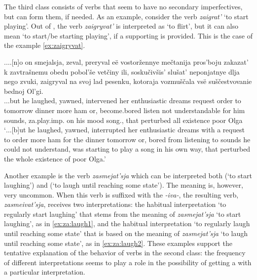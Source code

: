 The third class consists of verbs that seem to have no secondary imperfectives, but can form them, if needed. As an example, consider the verb \textit{zaigrat'} `to start playing'. Out of , the verb \textit{zaigryvat'} is interpreted as `to flirt', but it can also mean `to start/be starting playing', if a supporting  is provided. This is the case of the example \ref{ex:zaigryvat}. 

\exg.\label{ex:zaigryvat}$\ldots$[n]o on smejalsja, zeval, preryval e\"{e} vostor\v{z}ennye me\v{c}tanija pros'boju zakazat' k zavtra\v{s}nemu obedu pobol'\v{s}e vet\v{c}iny ili, sosku\v{c}iv\v{s}is' slu\v{s}at' neponjatnye dlja nego zvuki, zaigryval na svoj lad pesenku, kotoraja vozmu\v{s}\v{c}ala vs\"{e} su\v{s}\v{c}estvovanie bednoj Ol'gi.\\
$\ldots$but he laughed, yawned, intervened her enthusiastic dreams request order to tomorrow dinner more ham or, {become.bored} listen {not understandable} for him sounds, za.play.imp. on his mood song., that perturbed all existence poor Olga\\
\trans `$\ldots$[b]ut he laughed, yawned, interrupted her enthusiastic dreams with a request to order more ham for the dinner tomorrow or, bored from listening to sounds he could not understand, was starting to play a song in his own way, that perturbed the whole existence of poor Olga.'\\

Another example is the verb \textit{zasmejat'sja} which can be interpreted both  (`to start laughing') and  (`to laugh until reaching some state'). The  meaning is, however, very uncommon. When this verb is suffixed with the  \textit{-iva-}, the resulting verb, \textit{zasmeivat'sja}, receives two interpretations: the habitual interpretation `to regularly start laughing' that stems from the  meaning of \textit{zasmejat'sja} `to start laughing', as in \ref{ex:za:laugh1}, and the habitual interpretation `to regularly laugh until reaching some state' that is based on the  meaning of \textit{zasmejat'sja} `to laugh until reaching some state', as in \ref{ex:za:laugh2}. These examples support the tentative explanation of the behavior of verbs in the second class: the frequency of different interpretations seems to play a role in the possibility of getting a  with a particular interpretation.

